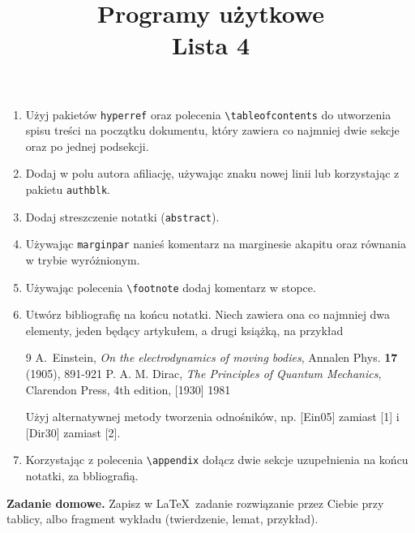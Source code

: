 \documentclass[12pt, letterpaper]{article}
\title{Programy użytkowe \\ Lista 4}
\date{}
\begin{document}
\maketitle
\begin{enumerate}
    \item Użyj pakietów \verb|hyperref| oraz polecenia \verb|\tableofcontents| do utworzenia spisu treści na początku dokumentu, który zawiera co najmniej dwie sekcje oraz po jednej podsekcji.
    \item Dodaj w polu autora afiliację, używając znaku nowej linii lub korzystając z pakietu \verb|authblk|.
    \item Dodaj streszczenie notatki (\verb|abstract|).
    \item Używając \verb|marginpar| nanieś komentarz na marginesie akapitu oraz równania w trybie wyróżnionym.
    \item Używając polecenia \verb|\footnote| dodaj komentarz w stopce.
    \item Utwórz bibliografię na końcu notatki. Niech zawiera ona co najmniej dwa elementy, jeden będący artykułem, a drugi książką, na przykład
    \begin{center}
    \begin{minipage}{0.7\linewidth}
        \begin{thebibliography}{9}
A.~Einstein,
\textit{On the electrodynamics of moving bodies},
Annalen Phys. \textbf{17} (1905), 891-921
P. A. M. Dirac, \textit{The Principles of Quantum Mechanics}, Clarendon Press, 4th edition, [1930] 1981
\end{thebibliography}
    \end{minipage}
        \end{center}
        Użyj alternatywnej metody tworzenia odnośników, np. [Ein05] zamiast [1] i [Dir30] zamiast [2].
    \item Korzystając z polecenia \verb|\appendix| dołącz dwie sekcje uzupełnienia na końcu notatki, za bbliografią. 
\end{enumerate}
\textbf{Zadanie domowe.} Zapisz w \LaTeX~zadanie rozwiązanie przez Ciebie przy tablicy, albo fragment wykładu (twierdzenie, lemat, przykład).
\end{document}
